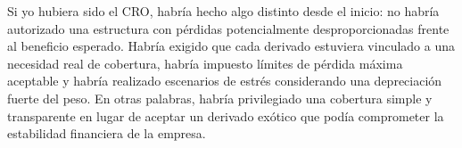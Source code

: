 Si yo hubiera sido el CRO, habr\'ia hecho algo distinto desde el inicio: no habr\'ia autorizado una estructura con p\'erdidas potencialmente desproporcionadas frente al beneficio esperado. Habr\'ia exigido que cada derivado estuviera vinculado a una necesidad real de cobertura, habr\'ia impuesto l\'imites de p\'erdida m\'axima aceptable y habr\'ia realizado escenarios de estr\'es considerando una depreciaci\'on fuerte del peso. En otras palabras, habr\'ia privilegiado una cobertura simple y transparente en lugar de aceptar un derivado ex\'otico que pod\'ia comprometer la estabilidad financiera de la empresa.